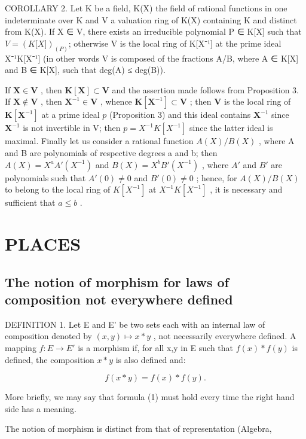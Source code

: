 COROLLARY 2. Let K be a field, K(X) the field of rational functions in one indeterminate over K and V a valuation ring of K(X) containing K and distinct from K(X). If X ∈ V, there exists an irreducible polynomial P ∈ K{[}X{]} such that \(V = (K{[}X{]})_{(P)}\); otherwise V is the local ring of K{[}X⁻¹{]} at the prime ideal X⁻¹K{[}X⁻¹{]} (in other words V is composed of the fractions A/B, where A ∈ K{[}X{]} and B ∈ K{[}X{]}, such that deg(A) ≤ deg(B)).

If \(\mathbf{X} \in \mathbf{V}\) , then \(\mathbf{K}[\mathbf{X}] \subset \mathbf{V}\) and the assertion made follows from Proposition 3. If \(\mathbf{X} \notin \mathbf{V}\) , then \(\mathbf{X}^{-1} \in \mathbf{V}\) , whence \(\mathbf{K}[\mathbf{X}^{-1}] \subset \mathbf{V}\) ; then \(\mathbf{V}\) is the local ring of \(\mathbf{K}[\mathbf{X}^{-1}]\) at a prime ideal \(p\) (Proposition 3) and this ideal contains \(\mathbf{X}^{-1}\) since \(\mathbf{X}^{-1}\) is not invertible in V; then \(p = X^{-1}K[X^{-1}]\) since the latter ideal is maximal. Finally let us consider a rational function \(A(X)/B(X)\) , where A and B are polynomials of respective degrees a and b; then \(A(X) = X^{a}A'(X^{-1})\) and \(B(X) = X^{b}B'(X^{-1})\) , where \(A'\) and \(B'\) are polynomials such that \(A'(0) \neq 0\) and \(B'(0) \neq 0\) ; hence, for \(A(X)/B(X)\) to belong to the local ring of \(K[X^{-1}]\) at \(X^{-1}K[X^{-1}]\) , it is necessary and sufficient that \(a \leqslant b\) .

\section{PLACES}

\subsection{The notion of morphism for laws of composition not everywhere defined}

DEFINITION 1. Let E and E' be two sets each with an internal law of composition denoted by \((x,y)\mapsto x*y\) , not necessarily everywhere defined. A mapping \(f:E\to E'\) is a morphism if, for all x,y in E such that \(f(x)*f(y)\) is defined, the composition \(x*y\) is also defined and:

\[
f (x * y) = f (x) * f (y).\tag{1}
\]

More briefly, we may say that formula (1) must hold every time the right hand side has a meaning.

The notion of morphism is distinct from that of representation (Algebra,

